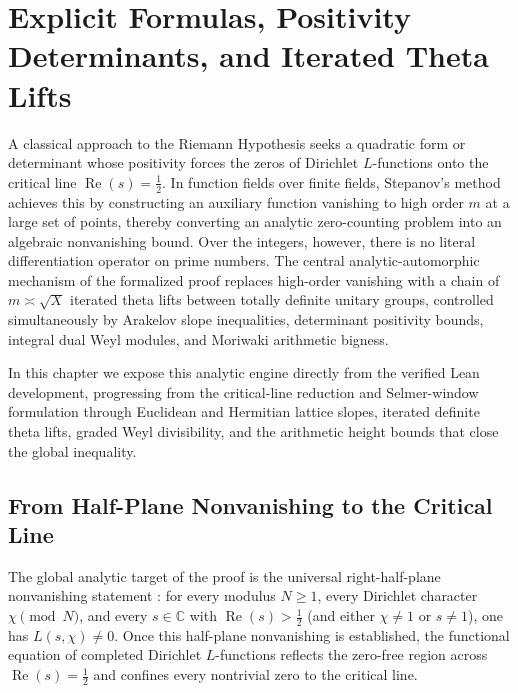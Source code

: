 \section{Explicit Formulas, Positivity Determinants, and Iterated Theta Lifts}
\label{sec:ch02-explicit-formula-theta-lifts}

A classical approach to the Riemann Hypothesis seeks a quadratic form or
determinant whose positivity forces the zeros of Dirichlet $L$-functions onto
the critical line $\operatorname{Re}(s) = \tfrac{1}{2}$.
In function fields over finite fields, Stepanov's method achieves this by
constructing an auxiliary function vanishing to high order $m$ at a large set
of points, thereby converting an analytic zero-counting problem into an
algebraic nonvanishing bound.
Over the integers, however, there is no literal differentiation operator on
prime numbers.
The central analytic-automorphic mechanism of the formalized proof replaces
high-order vanishing with a chain of $m \asymp \sqrt{X}$ iterated theta lifts
between totally definite unitary groups, controlled simultaneously by
Arakelov slope inequalities, determinant positivity bounds, integral dual Weyl
modules, and Moriwaki arithmetic bigness.

In this chapter we expose this analytic engine directly from the verified Lean
development, progressing from the critical-line reduction and Selmer-window
formulation through Euclidean and Hermitian lattice slopes, iterated definite
theta lifts, graded Weyl divisibility, and the arithmetic height bounds that
close the global inequality.

\subsection{From Half-Plane Nonvanishing to the Critical Line}
\label{subsec:ch02-critical-line}

The global analytic target of the proof is the universal right-half-plane
nonvanishing statement : for every modulus
$N \ge 1$, every Dirichlet character $\chi \pmod{N}$, and every
$s \in \mathbb{C}$ with $\operatorname{Re}(s) > \tfrac{1}{2}$ (and
either $\chi \neq 1$ or $s \neq 1$), one has $L(s, \chi) \neq 0$.
Once this half-plane nonvanishing is established, the functional equation of
completed Dirichlet $L$-functions reflects the zero-free region across
$\operatorname{Re}(s) = \tfrac{1}{2}$ and confines every nontrivial zero to the
critical line.

